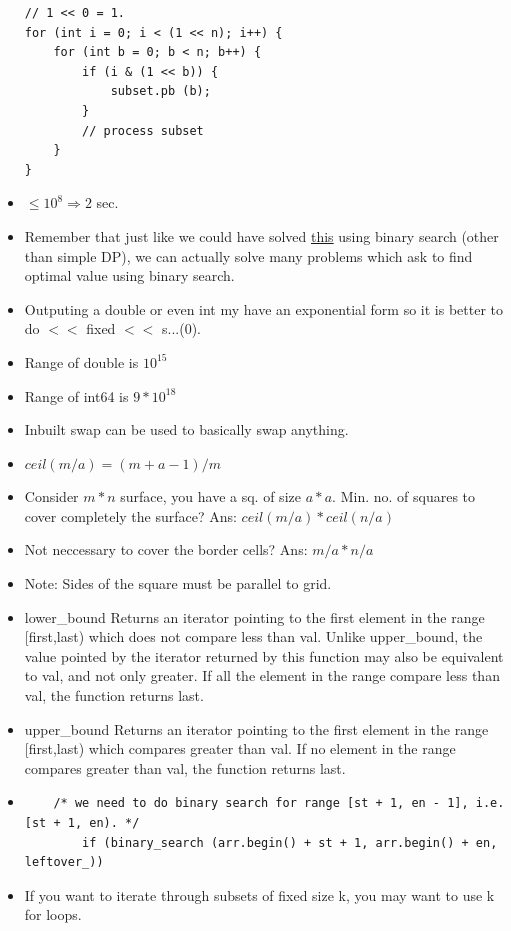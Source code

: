 \documentclass[8pt, a4paper, oneside, twocolumn]{extarticle}
\begin{document}
\begin{itemize}
\begin{verbatim}
// 1 << 0 = 1.
for (int i = 0; i < (1 << n); i++) {
    for (int b = 0; b < n; b++) {
        if (i & (1 << b)) {
            subset.pb (b);
        }
        // process subset
    }
}
\end{verbatim}
    \item $\leq 10^8 \Rightarrow 2$ sec.
    \item Remember that just like we could have solved \href{https://uva.onlinejudge.org/external/7/714.pdf}{this} using binary search (other than simple DP), we can actually solve many problems which ask to find optimal value using binary search.
    \item Outputing a double or even int my have an exponential form so it is better to do $<<$ fixed $<<$ s...(0).
    \item Range of double is $10^{15}$
    \item Range of int64 is $9 * 10^{18}$
    \item Inbuilt swap can be used to basically swap anything.
    \item $ceil(m/a) = (m + a - 1) / m$
    \item Consider $m*n$ surface, you have a sq. of size $a*a$. Min. no. of squares to cover completely the surface? Ans: $ceil(m/a)*ceil(n/a)$
    \item Not neccessary to cover the border cells? Ans: $m/a * n/a$
    \item Note: Sides of the square must be parallel to grid.
    \item  lower\_bound Returns an iterator pointing to the first element in the range [first,last) which does not compare less than val. Unlike upper\_bound, the value pointed by the iterator returned by this function may also be equivalent to val, and not only greater. If all the element in the range compare less than val, the function returns last.
    \item upper\_bound Returns an iterator pointing to the first element in the range [first,last) which compares greater than val. If no element in the range compares greater than val, the function returns last.
    \item 
    \begin{verbatim}
    /* we need to do binary search for range [st + 1, en - 1], i.e. [st + 1, en). */
        if (binary_search (arr.begin() + st + 1, arr.begin() + en, leftover_))
    \end{verbatim}
    \item If you want to iterate through subsets of fixed size k, you may want to use k for loops.

\end{itemize}
\end{document}

